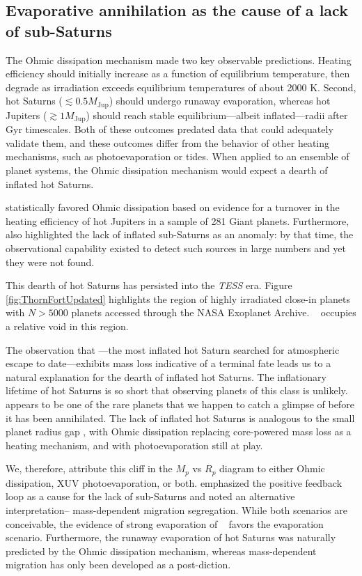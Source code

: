 \documentclass[twocolumn]{aastex631}
\newcommand{\hatpb}{\object{HAT-P-67 b}}
\begin{document}
\subsection{Evaporative annihilation as the cause of a lack of sub-Saturns}
The Ohmic dissipation mechanism made two key observable predictions.  Heating efficiency should initially increase as a function of equilibrium temperature, then degrade as irradiation exceeds equilibrium temperatures of about 2000 K.  Second, hot Saturns ($\lesssim0.5 M_\mathrm{Jup}$) should undergo runaway evaporation, whereas hot Jupiters ($\gtrsim 1 M_\mathrm{Jup}$) should reach stable equilibrium---albeit inflated---radii after Gyr timescales.  Both of these outcomes predated data that could adequately validate them, and these outcomes differ from the behavior of other heating mechanisms, such as photoevaporation or tides.  When applied to an ensemble of planet systems, the Ohmic dissipation mechanism would expect a dearth of inflated hot Saturns.

\citet{2018AJ....155..214T} statistically favored Ohmic dissipation based on evidence for a turnover in the heating efficiency of hot Jupiters in a sample of 281 Giant planets.  Furthermore, \citet{2018AJ....155..214T} also highlighted the lack of inflated sub-Saturns as an anomaly: by that time, the observational capability existed to detect such sources in large numbers and yet they were not found.


This dearth of hot Saturns has persisted into the \emph{TESS} era.  Figure \ref{fig:ThornFortUpdated} highlights the region of highly irradiated close-in planets with $N>5000$ planets accessed through the NASA Exoplanet Archive.  \hatpb~ occupies a relative void in this region.

The observation that \hatpb---the most inflated hot Saturn searched for atmospheric escape to date---exhibits mass loss indicative of a terminal fate leads us to a natural explanation for the dearth of inflated hot Saturns.  The inflationary lifetime of hot Saturns is so short that observing planets of this class is unlikely.  \hatpb~ appears to be one of the rare planets that we happen to catch a glimpse of before it has been annihilated.  The lack of inflated hot Saturns is analogous to the small planet radius gap \citep{2017AJ....154..109F}, with Ohmic dissipation replacing core-powered mass loss as a heating mechanism, and with photoevaporation still at play.

We, therefore, attribute this cliff in the $M_p$ vs $R_p$ diagram to either Ohmic dissipation, XUV photoevaporation, or both.  \citet{2018AJ....155..214T} emphasized the positive feedback loop as a cause for the lack of sub-Saturns and noted an alternative interpretation-- mass-dependent migration segregation.  While both scenarios are conceivable, the evidence of strong evaporation of \hatpb~ favors the evaporation scenario.  Furthermore, the runaway evaporation of hot Saturns was naturally predicted by the Ohmic dissipation mechanism, whereas mass-dependent migration has only been developed as a post-diction.  
\end{document}
